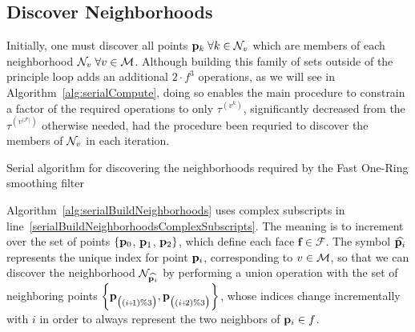 \subsection{Discover Neighborhoods}
Initially, one must discover all points $\mathbf{p}_k \; \forall k \in \mathcal{N}_v$ which are members of each neighborhood $\mathcal{N}_v \; \forall v \in \mathcal{M}$. Although building this family of sets outside of the principle loop adds an additional $2\cdot f^3$ operations, as we will see in Algorithm~\ref{alg:serialCompute}, doing so enables the main procedure to constrain a factor of the required operations to only $\tau^{(v^k)}$, significantly decreased from the $\tau^{(v^{|\mathcal{F}|})}$ otherwise needed, had the procedure been requried to discover the members of $\mathcal{N}_v$ in each iteration.
%
\begin{algorithm}
	\DontPrintSemicolon


	\bigskip
	\;
\nl	{}
	\caption{Serial algorithm for discovering the neighborhoods required by the Fast One-Ring smoothing filter\label{alg:serialBuildNeighborhoods}}
\end{algorithm}%
%
%
%
%

Algorithm~\ref{alg:serialBuildNeighborhoods} uses complex subscripts in line~\ref{serialBuildNeighborhoodsComplexSubscripts}. The meaning is to increment over the set of points $\{\mathbf{p}_0$, $\mathbf{p}_1$, $\mathbf{p}_2\}$, which define each face $\mathbf{f} \in \mathcal{F}$. The symbol $\widehat{\mathbf{p}_i}$ represents the unique index for point $\mathbf{p}_i$, corresponding to $v \in \mathcal{M}$, so that we can discover the neighborhood $\mathcal{N}_{\widehat{\mathbf{p}_i}}$ by performing a union operation with the set of neighboring points $\left \{\bp_{\big((\sipo)\%3\big)}, \bp_{\big((\sipt)\%3\big)}\right \}$, whose indices change incrementally with $i$ in order to always represent the two neighbors of $\mathbf{p}_i \in f$.
%
